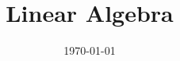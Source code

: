 \documentclass{book}
\title{Linear Algebra}
\author{}
\date{\today}
\theoremstyle{definition}
\begin{document}
\tableofcontents{}






 
\end{document}
